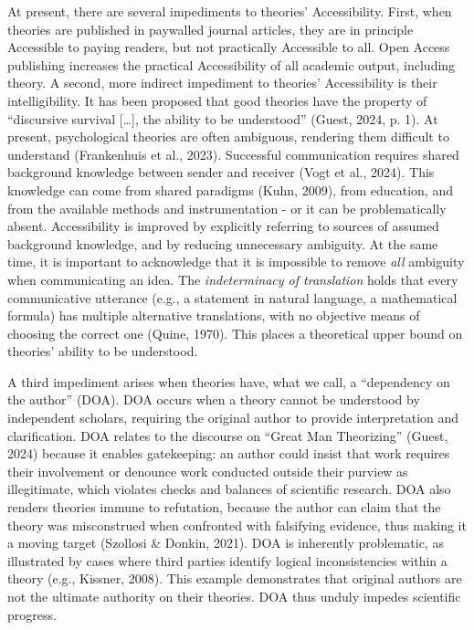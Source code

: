 \documentclass[man]{apa7}
\begin{document}
At present, there are several impediments to theories' Accessibility.
First, when theories are published in paywalled journal articles,
they are in principle Accessible to paying readers,
but not practically Accessible to all.
Open Access publishing increases the practical Accessibility of all academic output, including theory.
A second, more indirect impediment to theories' Accessibility is their intelligibility.
It has been proposed that good theories have the property of ``discursive survival {[}\ldots{]}, the ability to be understood'' (Guest, 2024, p. 1).
At present, psychological theories are often ambiguous, rendering them difficult to understand (Frankenhuis et al., 2023).
Successful communication requires shared background knowledge between sender and receiver (Vogt et al., 2024).
This knowledge can come from shared paradigms (Kuhn, 2009),
from education, and from the available methods and instrumentation - or it can be problematically absent.
Accessibility is improved by explicitly referring to sources of assumed background knowledge, and by reducing unnecessary ambiguity.
At the same time, it is important to acknowledge that it is impossible to remove \emph{all} ambiguity when communicating an idea.
The \emph{indeterminacy of translation} holds that every communicative utterance (e.g., a statement in natural language, a mathematical formula) has multiple alternative translations,
with no objective means of choosing the correct one (Quine, 1970).
This places a theoretical upper bound on theories' ability to be understood.

A third impediment arises when theories have, what we call, a ``dependency on the author'' (DOA).
DOA occurs when a theory cannot be understood by independent scholars,
requiring the original author to provide interpretation and clarification.
DOA relates to the discourse on ``Great Man Theorizing'' (Guest, 2024) because it enables gatekeeping: an author could insist that work requires their involvement or denounce work conducted outside their purview as illegitimate,
which violates checks and balances of scientific research.
DOA also renders theories immune to refutation,
because the author can claim that the theory was misconstrued when confronted with falsifying evidence, thus making it a moving target (Szollosi \& Donkin, 2021).
DOA is inherently problematic, as illustrated by cases where third parties identify logical inconsistencies within a theory (e.g., Kissner, 2008).
This example demonstrates that original authors are not the ultimate authority on their theories.
DOA thus unduly impedes scientific progress.
\end{document}
